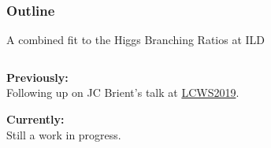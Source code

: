  \begin{frame}[noframenumbering]
    \frametitle{Outline}
    \begin{minipage}{.9\paperwidth}\noindent\center
      \Large A combined fit to the Higgs Branching Ratios at ILD
    \end{minipage}
    \vfill
    \begin{columns}[c,onlytextwidth]
      \begin{column}{0.4\textwidth}
        \textbf{\color{llblue}Previously:}\\
        Following up on JC Brient's talk at
        \href{https://agenda.linearcollider.org/event/8217/timetable/\#190-a-method-to-improve-the-pr}{\color{llblue} LCWS2019}.

        \bigbreak
        \textbf{\color{llblue}Currently:}\\
        Still a work in progress.

      \end{column}
      \begin{column}{0.5\textwidth}
        \tableofcontents
      \end{column}
    \end{columns}
  \end{frame}